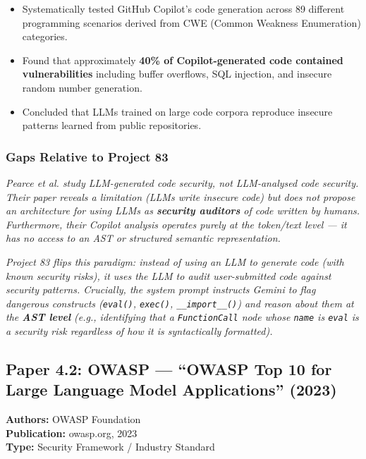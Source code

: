 \documentclass[a4paper,11pt]{article}
\newcommand{\papergap}[1]{%
  \begin{tcolorbox}[colback=red!5!white, colframe=red!60!black, title={Research Gap Identified}]
  \textit{#1}
  \end{tcolorbox}
}
\newcommand{\oursolution}[1]{%
  \begin{tcolorbox}[colback=green!5!white, colframe=green!60!black, title={How Project 83 Solves This Gap}]
  \textit{#1}
  \end{tcolorbox}
}
\begin{document}
\begin{itemize}
    \item Systematically tested GitHub Copilot's code generation across 89 different programming scenarios derived from CWE (Common Weakness Enumeration) categories.
    \item Found that approximately \textbf{40\% of Copilot-generated code contained vulnerabilities} including buffer overflows, SQL injection, and insecure random number generation.
    \item Concluded that LLMs trained on large code corpora reproduce insecure patterns learned from public repositories.
\end{itemize}

\subsubsection{Gaps Relative to Project 83}

\papergap{Pearce et al. study LLM-\textit{generated} code security, not LLM-\textit{analysed} code security. Their paper reveals a limitation (LLMs write insecure code) but does not propose an architecture for using LLMs as \textbf{security auditors} of code written by humans. Furthermore, their Copilot analysis operates purely at the token/text level --- it has no access to an AST or structured semantic representation.}

\oursolution{Project 83 flips this paradigm: instead of using an LLM to \textit{generate} code (with known security risks), it uses the LLM to \textit{audit} user-submitted code against security patterns. Crucially, the system prompt instructs Gemini to flag dangerous constructs (\texttt{eval()}, \texttt{exec()}, \texttt{\_\_import\_\_()}) and reason about them at the \textbf{AST level} (e.g., identifying that a \texttt{FunctionCall} node whose \texttt{name} is \texttt{eval} is a security risk regardless of how it is syntactically formatted).}

\subsection{Paper 4.2: OWASP --- ``OWASP Top 10 for Large Language Model Applications'' (2023)}

\begin{tcolorbox}[colback=gray!5, colframe=gray!40]
\textbf{Authors:} OWASP Foundation \\
\textbf{Publication:} owasp.org, 2023 \\
\textbf{Type:} Security Framework / Industry Standard
\end{tcolorbox}
\end{document}
